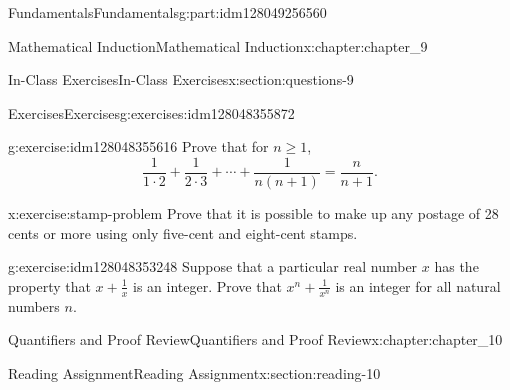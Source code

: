 \documentclass[oneside,10pt,]{book}
\numberwithin{equation}{section}
\begin{document}
\begin{partptx}{Fundamentals}{}{Fundamentals}{}{}{g:part:idm128049256560}
\begin{chapterptx}{Mathematical Induction}{}{Mathematical Induction}{}{}{x:chapter:chapter_9}
%
%
\typeout{************************************************}
\typeout{************************************************}
%
\begin{sectionptx}{In-Class Exercises}{}{In-Class Exercises}{}{}{x:section:questions-9}
%
%
%
\typeout{************************************************}
\typeout{************************************************}
%
\begin{exercises-subsection}{Exercises}{}{Exercises}{}{}{g:exercises:idm128048355872}
\par\medskip\noindent%
%
\begin{exercisegroup}
\begin{divisionexerciseeg}{1}{}{}{g:exercise:idm128048355616}%
Prove that for \(n\geq 1\),%
\begin{equation*}
\frac{1}{1\cdot 2 }+ \frac{1}{2\cdot 3}+ \cdots  + \frac{1}{n(n+1)}= \frac{n}{n+1}.
\end{equation*}
%
\end{divisionexerciseeg}%
\begin{divisionexerciseeg}{2}{}{}{x:exercise:stamp-problem}%
Prove that it is possible to make up any postage of 28 cents or more using only five-cent and eight-cent stamps.%
\end{divisionexerciseeg}%
\begin{divisionexerciseeg}{3}{}{}{g:exercise:idm128048353248}%
Suppose that a particular real number \(x\) has the property that \(x + \frac{1}{x}\) is an integer.  Prove that \(x^n + \frac{1}{x^n}\) is an integer for all natural numbers \(n\).%
\end{divisionexerciseeg}%
\end{exercisegroup}
\par\medskip\noindent
\end{exercises-subsection}
\end{sectionptx}
\end{chapterptx}
%
\typeout{************************************************}
\typeout{************************************************}
%
\begin{chapterptx}{Quantifiers and Proof Review}{}{Quantifiers and Proof Review}{}{}{x:chapter:chapter_10}
\index{}%
%
%
\typeout{************************************************}
\typeout{************************************************}
%
\begin{sectionptx}{Reading Assignment}{}{Reading Assignment}{}{}{x:section:reading-10}

\end{sectionptx}
\end{chapterptx}
\end{partptx}
\end{document}
